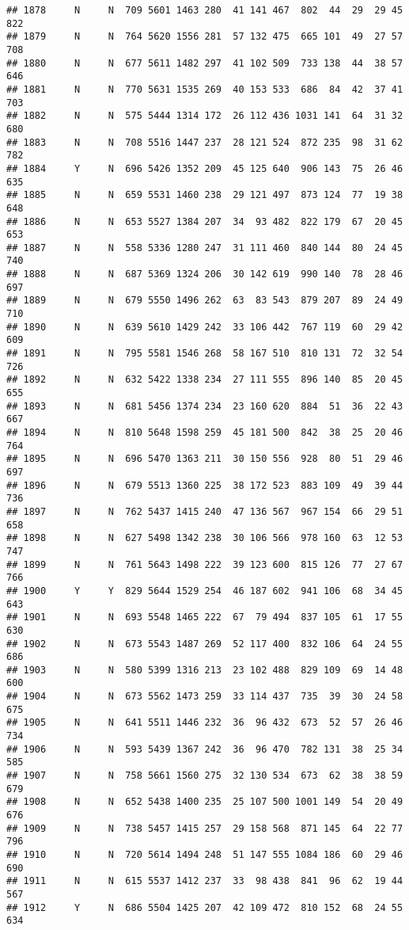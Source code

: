 \documentclass[]{article}
\begin{document}
\begin{verbatim}
## 1878     N     N  709 5601 1463 280  41 141 467  802  44  29  29 45  822
## 1879     N     N  764 5620 1556 281  57 132 475  665 101  49  27 57  708
## 1880     N     N  677 5611 1482 297  41 102 509  733 138  44  38 57  646
## 1881     N     N  770 5631 1535 269  40 153 533  686  84  42  37 41  703
## 1882     N     N  575 5444 1314 172  26 112 436 1031 141  64  31 32  680
## 1883     N     N  708 5516 1447 237  28 121 524  872 235  98  31 62  782
## 1884     Y     N  696 5426 1352 209  45 125 640  906 143  75  26 46  635
## 1885     N     N  659 5531 1460 238  29 121 497  873 124  77  19 38  648
## 1886     N     N  653 5527 1384 207  34  93 482  822 179  67  20 45  653
## 1887     N     N  558 5336 1280 247  31 111 460  840 144  80  24 45  740
## 1888     N     N  687 5369 1324 206  30 142 619  990 140  78  28 46  697
## 1889     N     N  679 5550 1496 262  63  83 543  879 207  89  24 49  710
## 1890     N     N  639 5610 1429 242  33 106 442  767 119  60  29 42  609
## 1891     N     N  795 5581 1546 268  58 167 510  810 131  72  32 54  726
## 1892     N     N  632 5422 1338 234  27 111 555  896 140  85  20 45  655
## 1893     N     N  681 5456 1374 234  23 160 620  884  51  36  22 43  667
## 1894     N     N  810 5648 1598 259  45 181 500  842  38  25  20 46  764
## 1895     N     N  696 5470 1363 211  30 150 556  928  80  51  29 46  697
## 1896     N     N  679 5513 1360 225  38 172 523  883 109  49  39 44  736
## 1897     N     N  762 5437 1415 240  47 136 567  967 154  66  29 51  658
## 1898     N     N  627 5498 1342 238  30 106 566  978 160  63  12 53  747
## 1899     N     N  761 5643 1498 222  39 123 600  815 126  77  27 67  766
## 1900     Y     Y  829 5644 1529 254  46 187 602  941 106  68  34 45  643
## 1901     N     N  693 5548 1465 222  67  79 494  837 105  61  17 55  630
## 1902     N     N  673 5543 1487 269  52 117 400  832 106  64  24 55  686
## 1903     N     N  580 5399 1316 213  23 102 488  829 109  69  14 48  600
## 1904     N     N  673 5562 1473 259  33 114 437  735  39  30  24 58  675
## 1905     N     N  641 5511 1446 232  36  96 432  673  52  57  26 46  734
## 1906     N     N  593 5439 1367 242  36  96 470  782 131  38  25 34  585
## 1907     N     N  758 5661 1560 275  32 130 534  673  62  38  38 59  679
## 1908     N     N  652 5438 1400 235  25 107 500 1001 149  54  20 49  676
## 1909     N     N  738 5457 1415 257  29 158 568  871 145  64  22 77  796
## 1910     N     N  720 5614 1494 248  51 147 555 1084 186  60  29 46  690
## 1911     N     N  615 5537 1412 237  33  98 438  841  96  62  19 44  567
## 1912     Y     N  686 5504 1425 207  42 109 472  810 152  68  24 55  634

\end{verbatim}
\end{document}
